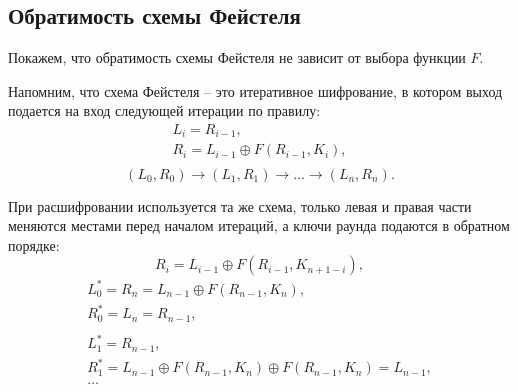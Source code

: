 \subsection{Обратимость схемы Фейстеля}

Покажем, что обратимость схемы Фейстеля не зависит от выбора функции $F$.

Напомним, что схема Фейстеля -- это итеративное шифрование, в котором выход подается на вход следующей итерации по правилу:
\[ \begin{array}{l}
    L_i = R_{i-1}, \\
    R_i = L_{i-1} \oplus F(R_{i-1}, K_i), \\
\end{array} \]
\[
    (L_0,R_0) \rightarrow (L_1,R_1) \rightarrow \ldots \rightarrow (L_n,R_n).
\]

При расшифровании используется та же схема, только левая и правая части меняются местами перед началом итераций, а ключи раунда подаются в обратном порядке:
    \[ R_i = L_{i-1} \oplus F(R_{i-1}, K_{n+1-i}), \]
\[ \begin{array}{l}
    L_0^* = R_n = L_{n-1} \oplus F(R_{n-1}, K_n), \\
    R_0^* = L_n = R_{n-1}, \\
    \\
    L_1^* = R_{n-1}, \\
    R_1^* = L_{n-1} \oplus F(R_{n-1}, K_n) \oplus F(R_{n-1}, K_n) = L_{n-1}, \\
    \dots
\end{array} \]
